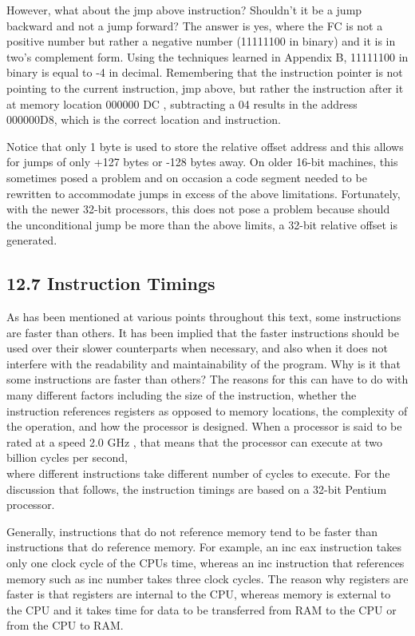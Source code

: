 \documentclass[10pt]{article}
\begin{document}
However, what about the jmp above instruction? Shouldn't it be a jump backward and not a jump forward? The answer is yes, where the FC is not a positive number but rather a negative number (11111100 in binary) and it is in two's complement form. Using the techniques learned in Appendix B, 11111100 in binary is equal to -4 in decimal. Remembering that the instruction pointer is not pointing to the current instruction, jmp above, but rather the instruction after it at memory location 000000 DC , subtracting a 04 results in the address 000000D8, which is the correct location and instruction.

Notice that only 1 byte is used to store the relative offset address and this allows for jumps of only +127 bytes or -128 bytes away. On older 16-bit machines, this sometimes posed a problem and on occasion a code segment needed to be rewritten to accommodate jumps in excess of the above limitations. Fortunately, with the newer 32-bit processors, this does not pose a problem because should the unconditional jump be more than the above limits, a 32-bit relative offset is generated.

\subsection*{12.7 Instruction Timings}
As has been mentioned at various points throughout this text, some instructions are faster than others. It has been implied that the faster instructions should be used over their slower counterparts when necessary, and also when it does not interfere with the readability and maintainability of the program. Why is it that some instructions are faster than others? The reasons for this can have to do with many different factors including the size of the instruction, whether the instruction references registers as opposed to memory locations, the complexity of the operation, and how the processor is designed. When a processor is said to be rated at a speed 2.0 GHz , that means that the processor can execute at two billion cycles per second,\\
where different instructions take different number of cycles to execute. For the discussion that follows, the instruction timings are based on a 32-bit Pentium processor.

Generally, instructions that do not reference memory tend to be faster than instructions that do reference memory. For example, an inc eax instruction takes only one clock cycle of the CPUs time, whereas an inc instruction that references memory such as inc number takes three clock cycles. The reason why registers are faster is that registers are internal to the CPU, whereas memory is external to the CPU and it takes time for data to be transferred from RAM to the CPU or from the CPU to RAM.
\end{document}

